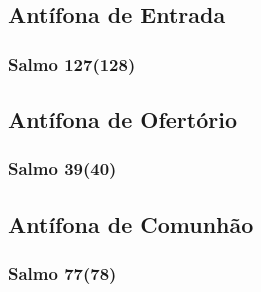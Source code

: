 \subsection{Antífona de Entrada}
\nopagebreak


\subsubsection{Salmo 127(128)}
\nopagebreak


\subsection{Antífona de Ofertório}
\nopagebreak


\subsubsection{Salmo 39(40)}
\nopagebreak


\AllowPageFlush

\subsection{Antífona de Comunhão}
\nopagebreak


\subsubsection{Salmo 77(78)}
\nopagebreak
